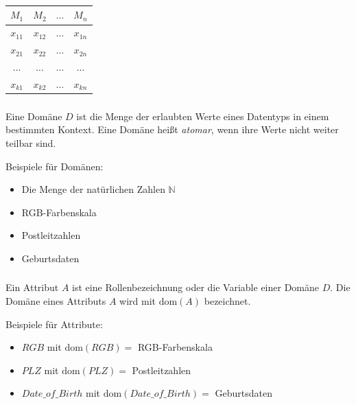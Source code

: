 \begin{frame}
 \frametitle{\insertsection}
 \framesubtitle{\insertsubsection}
 \begin{table}
  \begin{tabular}{cccc}\\\toprule
   \textbf{$M_1$} &\textbf{$M_2$}& \textbf{$\dots$} & \textbf{$M_n$}\\\midrule
   $x_{11}$ & $x_{12}$ & $\dots$ & $x_{1n}$ \\
   $x_{21}$ & $x_{22}$ & $\dots$ & $x_{2n}$ \\
   $\dots$ & $\dots$ & $\dots$ & $\dots$ \\
   $x_{k1}$ & $x_{k2}$ & $\dots$ & $x_{kn}$ \\\bottomrule
  \end{tabular}
 \end{table}
 \end{frame}

\begin{frame}\frametitle{\insertsection}
	\framesubtitle{\insertsubsection}
	\begin{definition}\label{def:domain}
		Eine Dom\"ane $D$ ist die Menge der erlaubten Werte eines Datentyps in einem bestimmten Kontext. Eine Dom\"ane
		hei\ss t \emph{atomar}, wenn ihre Werte nicht weiter teilbar sind.
	\end{definition}
\abs
	Beispiele für Dom\"anen:
	\begin{itemize}
		\item Die Menge der natürlichen Zahlen $\mathbb{N}$
		\item RGB-Farbenskala
		\item Postleitzahlen
		\item Geburtsdaten
	\end{itemize}
\abs
\end{frame}

\begin{frame}\frametitle{\insertsection}
\framesubtitle{\insertsubsection}
\begin{definition}[Attribute]\label{def:att}
	Ein Attribut $A$ ist eine Rollenbezeichnung oder die Variable einer Dom\"ane $D$. 
	Die Dom\"ane eines Attributs $A$ wird mit $\text{dom}(A)$ bezeichnet.
\end{definition}
\abs
{}
\abs\abs 
Beispiele für Attribute:
\begin{itemize}
	\item $RGB$ mit $\text{dom}(RGB) =$ RGB-Farbenskala
	\item $PLZ$ mit $\text{dom}(PLZ) =$ Postleitzahlen
	\item $Date\_of\_Birth$ mit $\text{dom}(Date\_of\_Birth) =$ Geburtsdaten
\end{itemize}
\end{frame}

